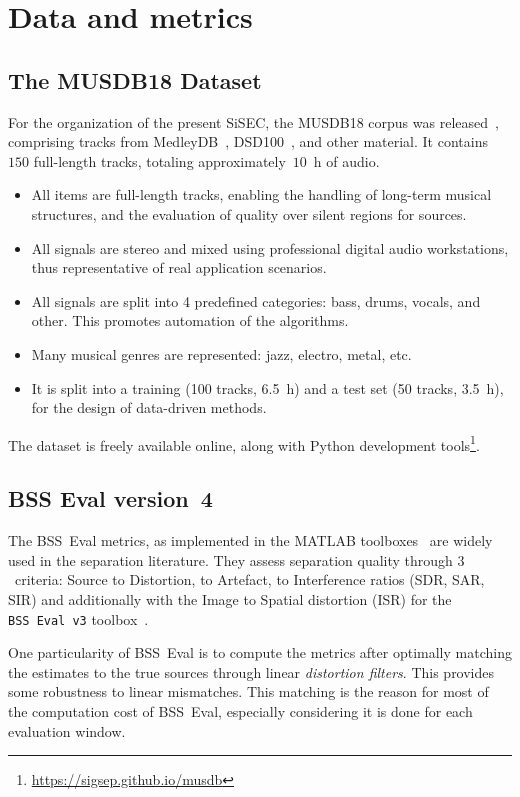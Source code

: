 \documentclass{article}
\begin{document}
\section{Data and metrics}

\subsection{The MUSDB18 Dataset}
For the organization of the present SiSEC, the MUSDB18 corpus was released~\cite{musdb18}, comprising tracks from MedleyDB~\cite{medleydb}, DSD100~\cite{sisec2015,sisec2016}, and other material. It contains $150$ full-length tracks, totaling approximately~$10$~h of audio.
\begin{itemize}
\item All items are full-length tracks, enabling the handling of long-term musical structures, and the evaluation of quality over silent regions for sources.
\item All signals are stereo and mixed using professional digital audio workstations, thus representative of real application scenarios.
\item All signals are split into 4 predefined categories: bass, drums, vocals, and other. This promotes automation of the algorithms.
\item Many musical genres are represented: jazz, electro, metal, etc.
\item It is split into a training (100 tracks, 6.5~h) and a test set (50 tracks, 3.5~h), for the design of data-driven methods.
\end{itemize}
The dataset is freely available online, along with Python development tools\footnote{\url{https://sigsep.github.io/musdb}}.

\subsection{BSS Eval version~4}
\label{ssec:bssevalv4}

The BSS~Eval metrics, as implemented in the MATLAB toolboxes~\cite{bssevalv2,bssevalv3} are widely used in the separation literature. They assess separation quality  through $3$~criteria: Source to Distortion, to Artefact, to Interference ratios (SDR, SAR, SIR) and additionally with the Image to Spatial distortion (ISR) for the \texttt{BSS~Eval v3} toolbox~\cite{bssevalv3}.

One particularity of BSS~Eval is to compute the metrics after optimally matching the estimates to the true sources through linear \textit{distortion filters}. This provides some robustness to linear mismatches. This matching is the reason for most of the computation cost of BSS~Eval, especially considering it is done for each evaluation window.
\end{document}

